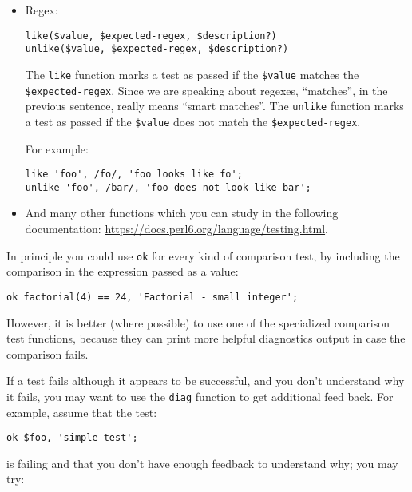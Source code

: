 \begin{itemize}
\item Regex:

\begin{verbatim}
like($value, $expected-regex, $description?)
unlike($value, $expected-regex, $description?)
\end{verbatim}

The {\tt like} function marks a test as passed if the 
\verb'$value' matches the \verb'$expected-regex'. Since 
we are speaking about regexes, ``matches'', in the 
previous sentence, really means ``smart matches''. The 
{\tt unlike} function marks a test as passed if the 
\verb'$value' does not match the \verb'$expected-regex'.

For example:
\begin{verbatim}
like 'foo', /fo/, 'foo looks like fo';
unlike 'foo', /bar/, 'foo does not look like bar';
\end{verbatim}

\item And many other functions which you can study in the 
following documentation: \url{https://docs.perl6.org/language/testing.html}.

\end{itemize}

In principle you could use {\tt ok} for every kind of 
comparison test, by including the comparison in the 
expression passed as a value:

\begin{verbatim}
ok factorial(4) == 24, 'Factorial - small integer';
\end{verbatim}

However, it is better (where possible) to use one of the 
specialized comparison test functions, because they can 
print more helpful diagnostics output in case the comparison 
fails.

If a test fails although it appears to be successful, and 
you don't understand why it fails, you may want to use the 
\verb'diag' function to get additional feed back. For example,
assume that the test:

\begin{verbatim}
ok $foo, 'simple test';
\end{verbatim} 

is failing and that you don't have enough feedback to 
understand why; you may try:


